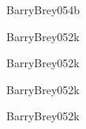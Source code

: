\begin{syllabus}
\begin{unit}{\ARMultiprocessingDef}{BarryBrey05}{4}{b}
    \ARMultiprocessingAllTopics
    \ARMultiprocessingAllObjectives
\end{unit}

\begin{unit}{\ARPerformanceEnhancementsDef}{BarryBrey05}{2}{k}
    \ARPerformanceEnhancementsAllTopics
    \ARPerformanceEnhancementsAllObjectives
\end{unit}

\begin{unit}{\ARDistributedArchitecturesDef}{BarryBrey05}{2}{k}
    \ARDistributedArchitecturesAllTopics
    \ARDistributedArchitecturesAllObjectives
\end{unit}

\begin{unit}{\ARDevicesDef}{BarryBrey05}{2}{k}
    \ARDevicesAllTopics
    \ARDevicesAllObjectives
\end{unit}

\begin{unit}{\ARDirectionsInComputingDef}{BarryBrey05}{2}{k}
    \ARDirectionsInComputingAllTopics
    \ARDirectionsInComputingAllObjectives
\end{unit}



\begin{coursebibliography}
\end{coursebibliography}

\end{syllabus}
